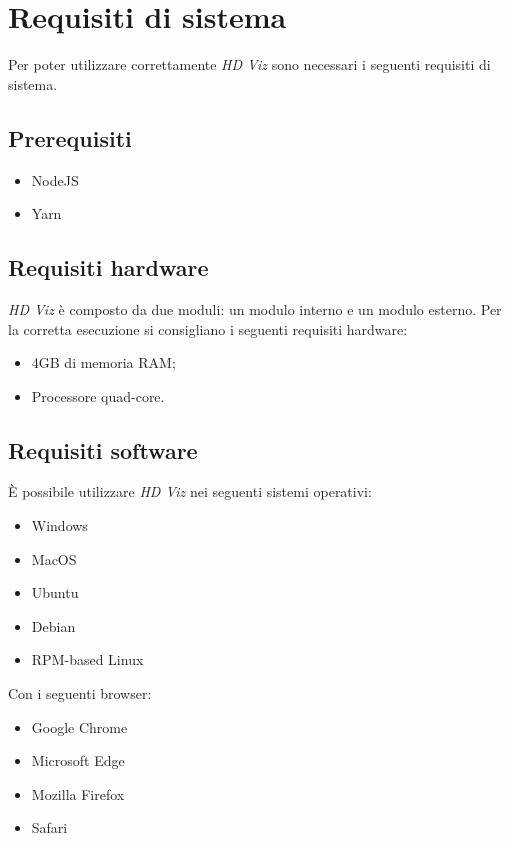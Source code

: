 \section{Requisiti di sistema}
Per poter utilizzare correttamente \textit{HD Viz} sono necessari i seguenti requisiti di sistema.
\subsection{Prerequisiti}
\begin{itemize}
  \item NodeJS 
  \item Yarn
\end{itemize}
\subsection{Requisiti hardware}
\textit{HD Viz} è composto da due moduli: un modulo interno e un modulo esterno. 
Per la corretta esecuzione si consigliano i seguenti requisiti hardware:
  \begin{itemize}
    \item 4GB di memoria RAM;
    \item Processore quad-core.
  \end{itemize}

\subsection{Requisiti software}
È possibile utilizzare \textit{HD Viz} nei seguenti sistemi operativi:
  \begin{itemize}
    \item Windows
    \item MacOS
    \item Ubuntu
    \item Debian
    \item RPM-based Linux
  \end{itemize}
Con i seguenti browser:
\begin{itemize}
  \item Google Chrome 
  \item Microsoft Edge
  \item Mozilla Firefox
  \item Safari
\end{itemize}
